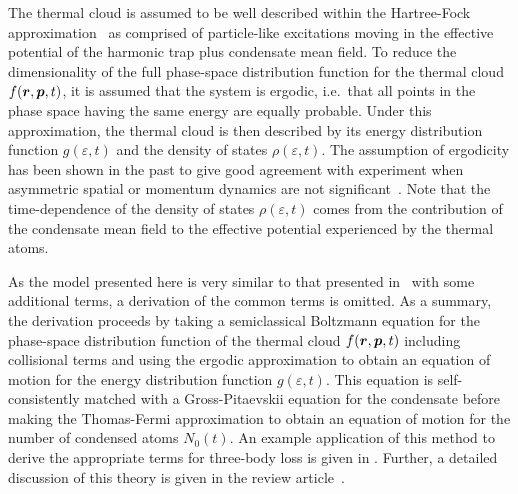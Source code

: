The thermal cloud is assumed to be well described within the Hartree-Fock approximation~\citep[Chapter 8]{PethickSmith} as comprised of particle-like excitations moving in the effective potential of the harmonic trap plus condensate mean field.  To reduce the dimensionality of the full phase-space distribution function for the thermal cloud $f(\bm{r}, \bm{p}, t)$, it is assumed that the system is ergodic, i.e.\  that all points in the phase space having the same energy are equally probable.  Under this approximation, the thermal cloud is then described by its energy distribution function $g(\varepsilon, t)$ and the density of states $\rho(\varepsilon, t)$.  The assumption of ergodicity has been shown in the past to give good agreement with experiment when asymmetric spatial or momentum dynamics are not significant~\citep{Bijlsma:2000,Davis:2000vn}.  Note that the time-dependence of the density of states $\rho(\varepsilon, t)$ comes from the contribution of the condensate mean field to the effective potential experienced by the thermal atoms.


As the model presented here is very similar to that presented in~\citep{Bijlsma:2000} with some additional terms, a derivation of the common terms is omitted. As a summary, the derivation proceeds by taking a semiclassical Boltzmann equation for the phase-space distribution function of the thermal cloud $f(\bm{r}, \bm{p}, t)$ including collisional terms and using the ergodic approximation to obtain an equation of motion for the energy distribution function $g(\varepsilon, t)$. This equation is self-consistently matched with a Gross-Pitaevskii equation for the condensate before making the Thomas-Fermi approximation to obtain an equation of motion for the number of condensed atoms $N_0(t)$. An example application of this method to derive the appropriate terms for three-body loss is given in . Further, a detailed discussion of this theory is given in the review article~\citep{Proukakis:2008}.

